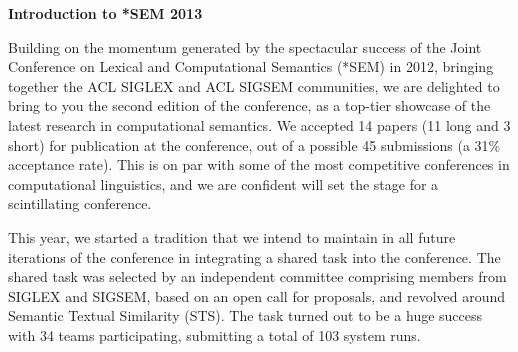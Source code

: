 \begin{center}
  {\Large \bf Introduction to *SEM 2013}
\end{center}


Building on the momentum generated by the spectacular success of the
Joint Conference on Lexical and Computational Semantics (*SEM) in 2012,
bringing together the ACL SIGLEX and ACL SIGSEM communities, we are
delighted to bring to you the second edition of the conference, as a
top-tier showcase of the latest research in computational semantics. We
accepted 14 papers (11 long and 3 short) for publication at the
conference, out of a possible 45 submissions (a 31\% acceptance
rate). This is on par with some of the most competitive conferences in
computational linguistics, and we are confident will set the stage for a
scintillating conference.  

This year, we started a tradition that we intend to maintain in all
future iterations of the conference in integrating a shared task into
the conference. The shared task was selected by an independent committee
comprising members from SIGLEX and SIGSEM, based on an open call for
proposals, and revolved around Semantic Textual Similarity (STS). The
task turned out to be a huge success with 34 teams participating,
submitting a total of 103 system runs.

